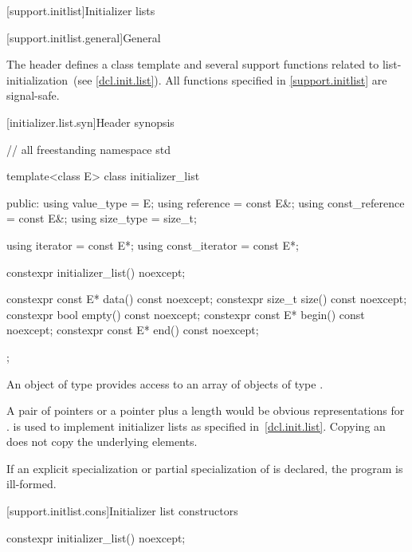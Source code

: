 [support.initlist]{Initializer lists}

[support.initlist.general]{General}

\pnum
The header  defines a class template and several
support functions related to list-initialization~(see \ref{dcl.init.list}).
%
All functions specified in \ref{support.initlist} are signal-safe.

[initializer.list.syn]{Header  synopsis}
%
%
%

\begin{codeblock}
// all freestanding
namespace std {
  template<class E> class initializer_list {
  public:
    using value_type      = E;
    using reference       = const E&;
    using const_reference = const E&;
    using size_type       = size_t;

    using iterator        = const E*;
    using const_iterator  = const E*;

    constexpr initializer_list() noexcept;

    constexpr const E* data() const noexcept;
    constexpr size_t size() const noexcept;
    constexpr bool empty() const noexcept;
    constexpr const E* begin() const noexcept;
    constexpr const E* end() const noexcept;
  };
}
\end{codeblock}

\pnum
An object of type  provides access to an array of
objects of type .
\begin{note}
A pair of pointers or a pointer plus
a length would be obvious representations for .
 is used to implement initializer lists as specified
in~\ref{dcl.init.list}. Copying an  does not copy the underlying
elements.
\end{note}

\pnum
If an explicit specialization or partial specialization of
 is declared, the program is ill-formed.

[support.initlist.cons]{Initializer list constructors}

%
\begin{itemdecl}
constexpr initializer_list() noexcept;
\end{itemdecl}

